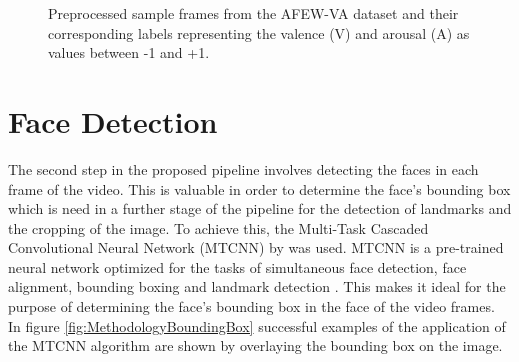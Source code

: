 \begin{figure}[H]
  \hfill
  \hfill
  \caption{Preprocessed sample frames from the AFEW-VA dataset \citep{Kossaifi:2017:AFEW-VADatabase} and their corresponding labels representing the valence (V) and arousal (A) as values between -1 and +1.}
  \label{fig:MethodologyPreprocess}
\end{figure}


\section{Face Detection}
The second step in the proposed pipeline involves detecting the faces in each frame of the video. This is valuable in order to determine the face's bounding box which is need in a further stage of the pipeline for the detection of landmarks and the cropping of the image. To achieve this, the Multi-Task Cascaded Convolutional Neural Network (MTCNN) by \citet{Zhang:2016:MTCCN} was used.
\newline\newline
MTCNN is a pre-trained neural network optimized for the tasks of simultaneous face detection, face alignment, bounding boxing and landmark detection \citep{Brownlee:2019:VggFace2HowToFaceRec}. This makes it ideal for the purpose of determining the face's bounding box in the face of the video frames. In figure \ref{fig:MethodologyBoundingBox} successful examples of the application of the MTCNN algorithm are shown by overlaying the bounding box on the image.

